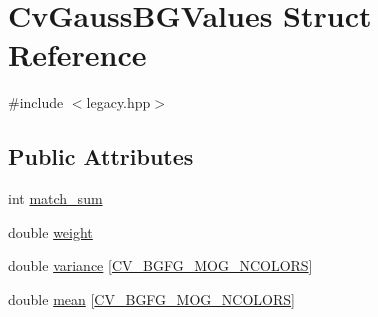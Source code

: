 \hypertarget{structCvGaussBGValues}{\section{Cv\-Gauss\-B\-G\-Values Struct Reference}
\label{structCvGaussBGValues}
}


{\ttfamily \#include $<$legacy.\-hpp$>$}

\subsection*{Public Attributes}
\begin{DoxyCompactItemize}
\item 
int \hyperlink{structCvGaussBGValues_a0ead7e4f776366c5746e0d2614491a3c}{match\-\_\-sum}
\item 
double \hyperlink{structCvGaussBGValues_a123de53e18b5254ec6557ddc542b1b42}{weight}
\item 
double \hyperlink{structCvGaussBGValues_ad70a97c35dda441899e98c84f94f3a71}{variance} \mbox{[}\hyperlink{legacy_8hpp_a8a3941fbda1c70e1ef162021e3fb579b}{C\-V\-\_\-\-B\-G\-F\-G\-\_\-\-M\-O\-G\-\_\-\-N\-C\-O\-L\-O\-R\-S}\mbox{]}
\item 
double \hyperlink{structCvGaussBGValues_a1a89e405a3b88c3776d56c8fb45b810c}{mean} \mbox{[}\hyperlink{legacy_8hpp_a8a3941fbda1c70e1ef162021e3fb579b}{C\-V\-\_\-\-B\-G\-F\-G\-\_\-\-M\-O\-G\-\_\-\-N\-C\-O\-L\-O\-R\-S}\mbox{]}
\end{DoxyCompactItemize}



